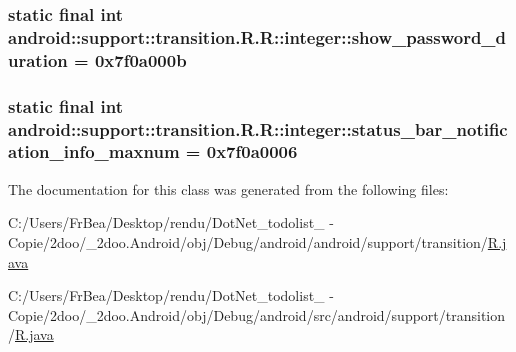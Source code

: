 \hypertarget{classandroid_1_1support_1_1transition_1_1_r_1_1integer_6b8cbe5ea75dd19ef32bf137aac63b2f}{
\subsubsection[{show\_\-password\_\-duration}]{\setlength{\rightskip}{0pt plus 5cm}static final int android::support::transition.R.R::integer::show\_\-password\_\-duration = 0x7f0a000b}}
\label{classandroid_1_1support_1_1transition_1_1_r_1_1integer_6b8cbe5ea75dd19ef32bf137aac63b2f}


\hypertarget{classandroid_1_1support_1_1transition_1_1_r_1_1integer_4ad3beeb62885f6ece159b16c67d7363}{
\subsubsection[{status\_\-bar\_\-notification\_\-info\_\-maxnum}]{\setlength{\rightskip}{0pt plus 5cm}static final int android::support::transition.R.R::integer::status\_\-bar\_\-notification\_\-info\_\-maxnum = 0x7f0a0006}}
\label{classandroid_1_1support_1_1transition_1_1_r_1_1integer_4ad3beeb62885f6ece159b16c67d7363}




The documentation for this class was generated from the following files:\begin{CompactItemize}
\item 
C:/Users/FrBea/Desktop/rendu/DotNet\_\-todolist\_ - Copie/2doo/\_\-2doo.Android/obj/Debug/android/android/support/transition/\hyperlink{android_2support_2transition_2_r_8java}{R.java}\item 
C:/Users/FrBea/Desktop/rendu/DotNet\_\-todolist\_ - Copie/2doo/\_\-2doo.Android/obj/Debug/android/src/android/support/transition/\hyperlink{src_2android_2support_2transition_2_r_8java}{R.java}\end{CompactItemize}

